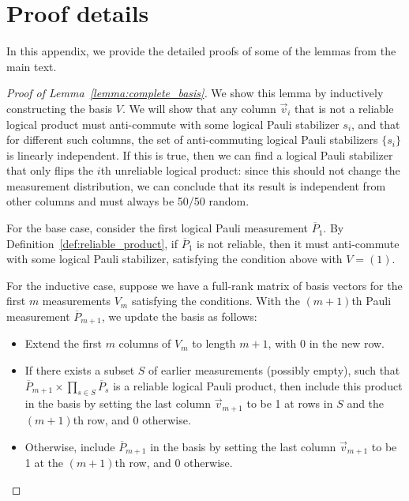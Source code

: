 \documentclass[prx,twocolumn,secnumarabic,balancelastpage,amsmath,amssymb,longbibliography]{revtex4-2}
\newcommand{\lop}[1]{\overline{#1}}
\newcommand{\nmeas}{m}
\begin{document}
\section{Proof details \label{appendix:proof}}
In this appendix, we provide the detailed proofs of some of the lemmas from the main text.

\begin{proof}[Proof of Lemma~\ref{lemma:complete_basis}]
We show this lemma by inductively constructing the basis $V$.
%
We will show that any column $\vec{v}_i$ that is not a reliable logical product must anti-commute with some logical Pauli stabilizer $s_i$, and that for different such columns, the set of anti-commuting logical Pauli stabilizers $\{s_i\}$ is linearly independent.
%
If this is true, then we can find a logical Pauli stabilizer that only flips the $i$th unreliable logical product: since this should not change the measurement distribution, we can conclude that its result is independent from other columns and must always be 50/50 random.

For the base case, consider the first logical Pauli measurement $\lop P_1$.
%
By Definition~\ref{def:reliable_product}, if $\lop P_1$ is not reliable, then it must anti-commute with some logical Pauli stabilizer, satisfying the condition above with $V=(1)$.

For the inductive case, suppose we have a full-rank matrix of basis vectors for the first $\nmeas$ measurements $V_\nmeas$ satisfying the conditions.
%
With the $(\nmeas+1)$th Pauli measurement $\lop P_{\nmeas+1}$, we update the basis as follows:
\begin{itemize}
    \item Extend the first $\nmeas$ columns of $V_\nmeas$ to length $\nmeas+1$, with 0 in the new row.
    \item If there exists a subset $S$ of earlier measurements (possibly empty), such that $\lop P_{\nmeas+1} \times \prod_{s\in S} \lop P_{s}$ is a reliable logical Pauli product, then include this product in the basis by setting the last column $\vec{v}_{\nmeas+1}$ to be 1 at rows in $S$ and the $(\nmeas+1)$th row, and 0 otherwise.
    \item Otherwise, include $\lop P_{\nmeas+1}$ in the basis by setting the last column $\vec{v}_{\nmeas+1}$ to be 1 at the $(\nmeas+1)$th row, and 0 otherwise.
\end{itemize}


\end{proof}
\end{document}
